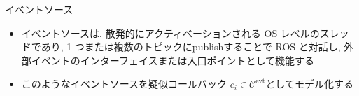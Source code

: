 \begin{frame}{イベントソース}
    \begin{itemize}
        \item イベントソースは, 散発的にアクティベーションされる OS レベルのスレッドであり, 1 つまたは複数のトピックにpublishすることで ROS と対話し, 外部イベントのインターフェイスまたは入口ポイントとして機能する
        \item このようなイベントソースを疑似コールバック $c_{i} \in \mathcal{C}^{\text {evt}}$としてモデル化する
    \end{itemize}
\end{frame}
